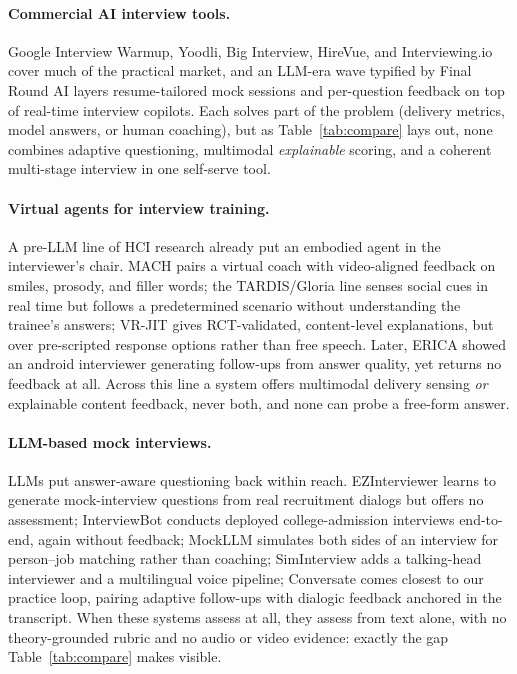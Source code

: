 \documentclass[11pt]{article}
\begin{document}
\paragraph{Commercial AI interview tools.} Google Interview Warmup, Yoodli, Big Interview, HireVue, and Interviewing.io cover much of the practical market, and an LLM-era wave typified by Final Round AI layers resume-tailored mock sessions and per-question feedback on top of real-time interview copilots. Each solves part of the problem (delivery metrics, model answers, or human coaching), but as Table~\ref{tab:compare} lays out, none combines adaptive questioning, multimodal \emph{explainable} scoring, and a coherent multi-stage interview in one self-serve tool.

\paragraph{Virtual agents for interview training.} A pre-LLM line of HCI research already put an embodied agent in the interviewer's chair. MACH \citep{hoque2013mach} pairs a virtual coach with video-aligned feedback on smiles, prosody, and filler words; the TARDIS/Gloria line \citep{anderson2013tardis,baur2013job,langer2016dear} senses social cues in real time but follows a predetermined scenario without understanding the trainee's answers; VR-JIT \citep{smith2014virtual} gives RCT-validated, content-level explanations, but over pre-scripted response options rather than free speech. Later, ERICA \citep{inoue2020jobinterviewer} showed an android interviewer generating follow-ups from answer quality, yet returns no feedback at all. Across this line a system offers multimodal delivery sensing \emph{or} explainable content feedback, never both, and none can probe a free-form answer.

\paragraph{LLM-based mock interviews.} LLMs put answer-aware questioning back within reach. EZInterviewer \citep{li2023ezinterviewer} learns to generate mock-interview questions from real recruitment dialogs but offers no assessment; InterviewBot \citep{wang2023interviewbot} conducts deployed college-admission interviews end-to-end, again without feedback; MockLLM \citep{sun2025mockllm} simulates both sides of an interview for person--job matching rather than coaching; SimInterview \citep{nguyen2025siminterview} adds a talking-head interviewer and a multilingual voice pipeline; Conversate \citep{daryanto2025conversate} comes closest to our practice loop, pairing adaptive follow-ups with dialogic feedback anchored in the transcript. When these systems assess at all, they assess from text alone, with no theory-grounded rubric and no audio or video evidence: exactly the gap Table~\ref{tab:compare} makes visible.
\end{document}
